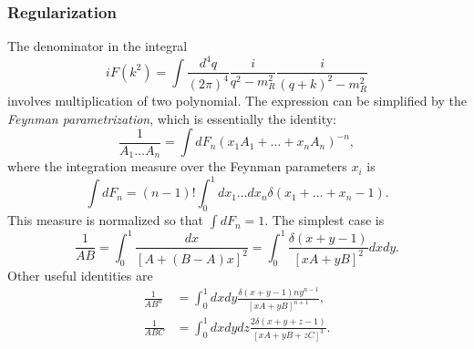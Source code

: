 \documentclass[aps,prb,superscriptaddress,nofootinbib]{revtex4}
\begin{document}
\subsubsection{Regularization}
The denominator in the integral
\begin{equation}
	iF(k^2) = \int \frac{d^4 q}{(2\pi)^4} \frac{i}{q^2-m_R^2} \frac{i}{(q+k)^2-m_R^2}
\end{equation}
involves multiplication of two polynomial.
The expression can be simplified by the \textit{Feynman parametrization}, which is essentially the identity:
\begin{equation}
	\frac{1}{A_{1} \ldots A_{n}}=\int d F_{n}\left(x_{1} A_{1}+\ldots+x_{n} A_{n}\right)^{-n},
\end{equation}
where the integration measure over the Feynman parameters $x_{i}$ is
\begin{equation}
	\int d F_{n}=(n-1) ! \int_{0}^{1} d x_{1} \ldots d x_{n} \delta\left(x_{1}+\ldots+x_{n}-1\right).
\end{equation}
This measure is normalized so that $\int d F_{n} =1$. 
The simplest case is
\begin{equation}
	\frac{1}{A B}=\int_{0}^{1} \frac{dx}{[A+(B-A) x]^{2}}
	=\int_{0}^{1} \frac{\delta(x+y-1)}{[x A+y B]^{2}} dx dy.
\end{equation}
Other useful identities are
\begin{equation}
\begin{aligned}
	\frac{1}{A B^{n}} &=\int_{0}^{1} dxdy\frac{\delta(x+y-1)n y^{n-1}}{[x A+y B]^{n+1}} , \\
	\frac{1}{A B C} &=\int_{0}^{1} dxdydz \frac{2\delta(x+y+z-1)}{[x A+y B+z C]^{3}} .
\end{aligned}
\end{equation}
\end{document}
